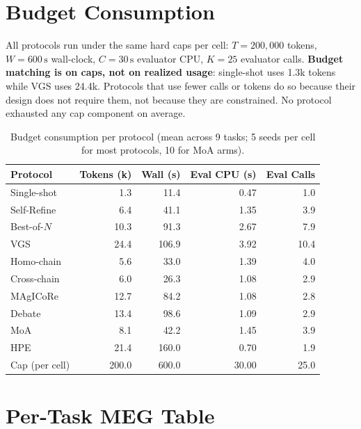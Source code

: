 \documentclass{article}
\begin{document}
\section{Budget Consumption}
\label{app:budget}

All protocols run under the same hard caps per cell: $T{=}200{,}000$ tokens, $W{=}600\,\text{s}$ wall-clock, $C{=}30\,\text{s}$ evaluator CPU, $K{=}25$ evaluator calls. \textbf{Budget matching is on caps, not on realized usage}: single-shot uses 1.3k tokens while VGS uses 24.4k. Protocols that use fewer calls or tokens do so because their design does not require them, not because they are constrained. No protocol exhausted any cap component on average.

\begin{table}[h]
\caption{Budget consumption per protocol (mean across 9 tasks; 5 seeds per cell for most protocols, 10 for MoA arms).}
\label{tab:budget}
\centering
\small
\begin{tabular}{l r r r r}
\toprule
Protocol & Tokens (k) & Wall (s) & Eval CPU (s) & Eval Calls \\
\midrule
Single-shot          &      1.3 &    11.4 &         0.47 &        1.0 \\
Self-Refine          &      6.4 &    41.1 &         1.35 &        3.9 \\
Best-of-$N$          &     10.3 &    91.3 &         2.67 &        7.9 \\
VGS                  &     24.4 &   106.9 &         3.92 &       10.4 \\
Homo-chain           &      5.6 &    33.0 &         1.39 &        4.0 \\
Cross-chain          &      6.0 &    26.3 &         1.08 &        2.9 \\
MAgICoRe             &     12.7 &    84.2 &         1.08 &        2.8 \\
Debate               &     13.4 &    98.6 &         1.09 &        2.9 \\
MoA                  &      8.1 &    42.2 &         1.45 &        3.9 \\
HPE                  &     21.4 &   160.0 &         0.70 &        1.9 \\
\midrule
Cap (per cell)        & 200.0 &   600.0 &        30.00 &       25.0 \\
\bottomrule
\end{tabular}
\end{table}

\section{Per-Task MEG Table}
\label{app:megtable}
\end{document}
